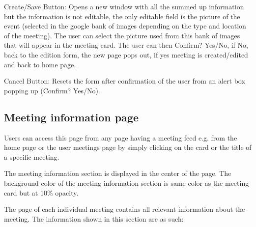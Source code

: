 \documentclass[conference]{IEEEtran}
\begin{document}
Create/Save Button: Opens a new window with all the summed up information but the information is not editable, the only editable field is the picture of the event (selected in the google bank of images depending on the type and location of the meeting).
The user can select the picture used from this bank of images that will appear in the meeting card.
The user can then Confirm? Yes/No, if No, back to the edition form, the new page pops out, if yes meeting is created/edited and back to home page.

Cancel Button: Resets the form after confirmation of the user from an alert box popping up (Confirm? Yes/No).

\subsection{Meeting information page}

Users can access this page from any page having a meeting feed e.g. from the home page or the user meetings page by simply clicking on the card or the title of a specific meeting.

The meeting information section is displayed in the center of the page.
The background color of the meeting information section is same color as the meeting card but at 10\% opacity.

The page of each individual meeting contains all relevant information about the meeting.
The information shown in this section are as such:
\end{document}
